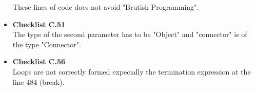 \documentclass[../../../../codeInspection.tex]{subfiles}
\begin{document}
\begin{itemize}
		          These lines of code does not avoid "Brutish Programming".

		    \item \textbf{Checklist C.51} \\

		    	  

		    	  The type of the second parameter has to be "Object" and "connector" is of the type "Connector".

		    \item \textbf{Checklist C.56} \\

		    	  

		    	  Loops are not correctly formed expecially the termination expression at the line 484 (break).

		\end{itemize}
\end{document}

